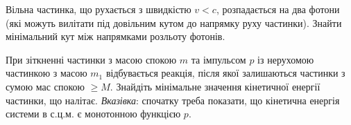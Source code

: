 %
%
%
%
%

\begin{problem}
Вільна частинка, що рухається з швидкістю $v < c$, розпадається на два фотони (які можуть вилітати під довільним кутом до напрямку руху частинки). Знайти мінімальний кут між напрямками розльоту фотонів.
\end{problem}

\begin{problem}
При зіткненні частинки з масою спокою $m$ та імпульсом $p$ із нерухомою частинкою з масою $m_1$ відбувається реакція, після якої залишаються частинки з сумою мас спокою $\ge M$. Знайдіть мінімальне значення кінетичної енергії частинки, що налітає. \emph{Вказівка}: спочатку треба показати, що кінетична енергія системи в с.ц.м. є монотонною функцією $p$.
\end{problem}


